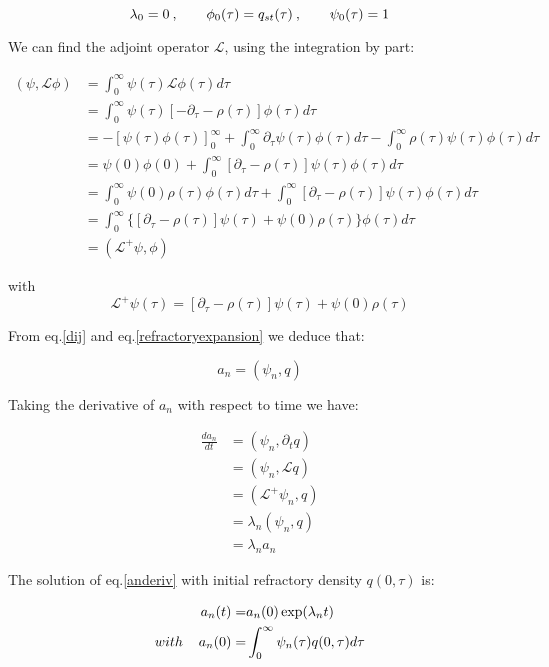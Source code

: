 \documentclass[a4paper,12pt,twoside]{article}
\def \be {\begin{equation}}
\def \ee {\end{equation}}
\begin{document}
\be
\lambda_0=0\:, \hspace{0.7cm} \phi_0(\tau)=q_{st}(\tau)\:,\hspace{0.7cm} \psi_0(\tau)=1
\ee

We can find the adjoint operator $\mathcal{L}$, using the integration by part:

\begin{align}
(\psi,\mathcal{L}\phi)&= \int_{0}^{\infty}\psi(\tau)\mathcal{L}\phi(\tau)d\tau  \nonumber \\
&= \int_{0}^{\infty}\psi(\tau)[-\partial_{\tau}-\rho(\tau)]\phi(\tau)d\tau  \nonumber \\
&=-[\psi(\tau)\phi(\tau)]^{\infty}_{0}+\int_{0}^{\infty}\partial_{\tau}\psi(\tau)\phi(\tau)d\tau -\int_{0}^{\infty}\rho(\tau)\psi(\tau)\phi(\tau)d\tau \nonumber \\
&= \psi(0)\phi(0)+ \int_{0}^{\infty}[\partial_{\tau}-\rho(\tau)]\psi(\tau)\phi(\tau)d\tau  \nonumber \\
&=\int_{0}^{\infty} \psi(0)\rho(\tau)\phi(\tau)d\tau+ \int_{0}^{\infty}[\partial_{\tau}-\rho(\tau)]\psi(\tau)\phi(\tau)d\tau  \nonumber \\
&= \int_{0}^{\infty}\{[\partial_{\tau}-\rho(\tau)]\psi(\tau)+ \psi(0)\rho(\tau)\}\phi(\tau)d\tau  \nonumber \\
& = (\mathcal{L}^+\psi,\phi)
\end{align}

with 
\be
\label{Ldega}
\mathcal{L}^+\psi(\tau)=[\partial_{\tau}-\rho(\tau)]\psi(\tau)+\psi(0)\rho(\tau)
\ee

From eq.\eqref{dij} and eq.\eqref{refractoryexpansion} we deduce that:

\be
\label{an}
a_n=(\psi_n,q)
\ee

Taking the derivative of $a_n$ with respect to time we have:

\begin{align}
\label{anderiv}
\frac{d a_n}{dt}&=(\psi_n,\partial_tq) \nonumber \\
&=(\psi_n,\mathcal{L}q)  \nonumber \\
&=(\mathcal{L}^+\psi_n,q) \nonumber \\
&=\lambda_n(\psi_n,q) \nonumber \\
&=\lambda_na_n
\end{align}

The solution of eq.\eqref{anderiv} with initial refractory density $q(0,\tau)$ is:

\begin{align}
\label{ant}
a_n(t) = &a_n(0)\exp(\lambda_nt)\\
with \hspace{0.4cm} a_n(0) = & \int_{0}^{\infty}\psi_n(\tau)q(0,\tau)d\tau
\end{align}
\end{document}
